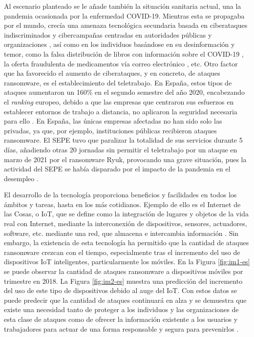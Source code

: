 Al escenario planteado se le añade también la situación sanitaria actual, una la pandemia ocasionada por la enfermedad \gls{COVID-19}. Mientras esta se propagaba por el mundo, crecía una amenaza tecnológica secundaria basada en ciberataques indiscriminados y cibercampañas centradas en autoridades públicas y organizaciones \cite{LALLIE2021102248}, así como en los individuos basándose en su desinformación y temor, como la falsa distribución de libros con información sobre el \gls{COVID-19} \cite{MALWLABS}, la oferta fraudulenta de medicamentos vía correo electrónico \cite{NORTON}, etc.
Otro factor que ha favorecido el aumento de ciberataques, y en concreto, de ataques ransomware, es el establecimiento del teletrabajo. En España, estos tipos de ataques aumentaron un 160\% en el segundo semestre del año 2020, encabezando el \textit{ranking} europeo, debido a que las empresas que centraron sus esfuerzos en establecer entornos de trabajo a distancia, no aplicaron la seguridad necesaria para ello \cite{ELPAIS}. En España, las únicas empresas afectadas no han sido solo las privadas, ya que, por ejemplo, instituciones públicas recibieron ataques ransomware. El \gls{SEPE} tuvo que paralizar la totalidad de sus servicios durante 5 días, añadiendo otras 20 jornadas sin permitir el teletrabajo por un ataque en marzo de 2021 por el ransomware Ryuk, provocando una grave situación, pues la actividad del \gls{SEPE} se había disparado por el impacto de la pandemia en el desempleo \cite{RYUKSEPE}.


El desarrollo de la tecnología proporciona beneficios y facilidades en todos los ámbitos y tareas, hasta en los más cotidianos. Ejemplo de ello es el Internet de las Cosas, o \gls{IoT}, que se define como la integración de lugares y objetos de la vida real con Internet, mediante la interconexión de dispositivos, sensores, actuadores, software, etc. mediante una red, que almacena e intercambia información \cite{IoTDEF}. Sin embargo, la existencia de esta tecnología ha permitido que la cantidad de ataques ransomware crezcan con el tiempo, especialmente tras el incremento del uso de dispositivos \gls{IoT} inteligentes, particularmente los móviles. En la Figura \ref{fig:im1-es} se puede observar la cantidad de ataques ransomware a dispositivos móviles por trimestre en 2018. La Figura \ref{fig:im2-es} muestra una predicción del incremento del uso de este tipo de dispositivos debido al auge del \gls{IoT}. Con estos datos se puede predecir que la cantidad de ataques continuará en alza y se demuestra que existe una necesidad tanto de proteger a los individuos y las organizaciones de esta clase de ataques como de ofrecer la información existente a los usuarios y trabajadores  para actuar de una forma responsable y segura para prevenirlos \cite{HUMAYUN2021105}.

